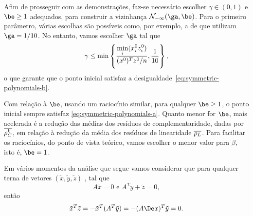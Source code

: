 




Afim de prosseguir com as demonstrações, faz-se necessário  escolher  $\gamma\in(0,1)$  e $\be\geq 1$ adequados, para construir a vizinhança $\Nset_{-\infty}(\ga,\be)$. Para o primeiro parâmetro, várias escolhas são possíveis como, por exemplo, a de 
\textcite{Colombo:2008ia} que utilizam $\ga = 1/10$. No entanto, vamos escolher $\ga$ tal que  
\[
\gamma \leq  \min\left\{ \frac{\displaystyle \min_{i}(x^0_{i} z^0_{i} )}{(x^0 )^Tz^0 /n}, \frac{1}{10}\right\},
\]
o que garante que o ponto inicial satisfaz a desigualdade~\eqref{eq:symmetric-polynomials-b}.

Com relação à $\be$,  usando um raciocínio similar, para qualquer  $\be\geq 1$, o ponto inicial sempre satisfaz \eqref{eq:symmetric-polynomials-a}. Quanto menor for $\be$, mais acelerada é a redução  das médias dos resíduos de complementaridade, dadas por $\overline{\rho_C^k }$, em relação à redução da média dos resíduos de linearidade $\overline{\rho_L}$. Para facilitar os raciocínios, do ponto de vista teórico, vamos escolher o menor valor para $\beta$, isto é, $\be=1$.


\begin{obs}
	Em vários momentos da análise que segue vamos considerar que para qualquer terna de vetores $(\tilde{x},\tilde{y},\tilde{z})$ ,  tal que 
\begin{equation}
	\label{eq:Ax0-ATyz0}
	A\tilde{x}=0 \text{ e } A^T\tilde{y} + \tilde{z} = 0,
\end{equation}
então
\begin{equation}
	\label{eq:xTziszero}
	\tilde{x}^T\tilde{z} =  - \tilde{x}^T(A^T\tilde{y})  = -(A\Dex)^T\tilde{y} = 0.
\end{equation}
\end{obs}



